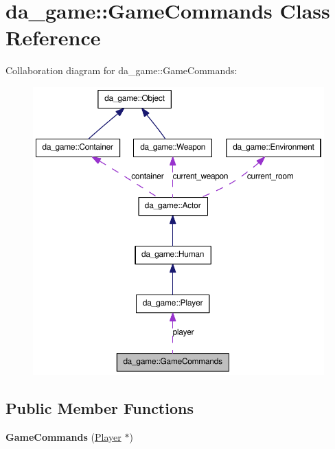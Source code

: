 \hypertarget{classda__game_1_1GameCommands}{
\section{da\_\-game::GameCommands Class Reference}
\label{classda__game_1_1GameCommands}
}
Collaboration diagram for da\_\-game::GameCommands:\nopagebreak
\begin{figure}[H]
\begin{center}
\leavevmode
\includegraphics[width=394pt]{classda__game_1_1GameCommands__coll__graph}
\end{center}
\end{figure}
\subsection*{Public Member Functions}
\begin{DoxyCompactItemize}
\item 
\hypertarget{classda__game_1_1GameCommands_a7f93d626b2cf6b976c49da0a038ef2ea}{
{\bfseries GameCommands} (\hyperlink{classda__game_1_1Player}{Player} $\ast$)}
\label{classda__game_1_1GameCommands_a7f93d626b2cf6b976c49da0a038ef2ea}

\end{DoxyCompactItemize}

